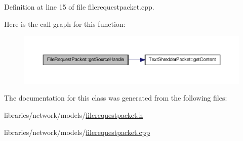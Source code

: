 Definition at line 15 of file filerequestpacket.cpp.



Here is the call graph for this function:\nopagebreak
\begin{figure}[H]
\begin{center}
\leavevmode
\includegraphics[width=400pt]{class_file_request_packet_abcc5c432f601466b1714d4beda837e50_cgraph}
\end{center}
\end{figure}




The documentation for this class was generated from the following files:\begin{DoxyCompactItemize}
\item 
libraries/network/models/\hyperlink{filerequestpacket_8h}{filerequestpacket.h}\item 
libraries/network/models/\hyperlink{filerequestpacket_8cpp}{filerequestpacket.cpp}\end{DoxyCompactItemize}
